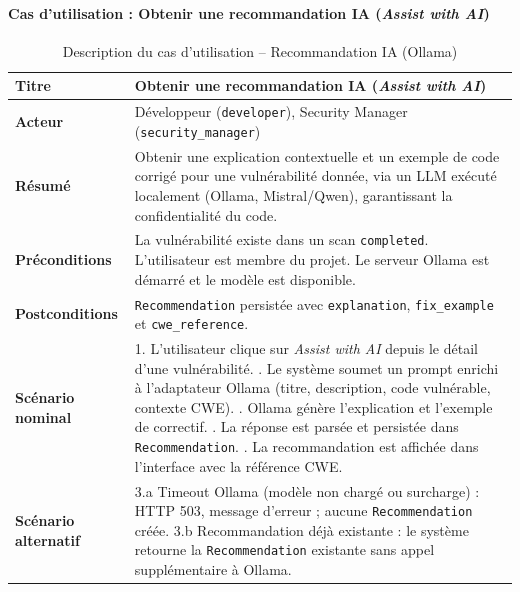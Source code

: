 \paragraph{Cas d'utilisation : Obtenir une recommandation IA (\textit{Assist with AI})}
\begin{table}[H]
\centering
\caption{Description du cas d'utilisation -- Recommandation IA (Ollama)}
\label{tab:uc-llm}
\small
\renewcommand{\arraystretch}{1.3}
\begin{tabularx}{\textwidth}{>{\bfseries}p{3.5cm} X}
\hline
Titre & Obtenir une recommandation IA (\textit{Assist with AI}) \\
\hline
Acteur & Développeur (\texttt{developer}), Security Manager (\texttt{security\_manager}) \\
\hline
Résumé & Obtenir une explication contextuelle et un exemple de code corrigé pour une vulnérabilité donnée, via un LLM exécuté localement (Ollama, Mistral/Qwen), garantissant la confidentialité du code. \\
\hline
Préconditions & La vulnérabilité existe dans un scan \texttt{completed}. L'utilisateur est membre du projet. Le serveur Ollama est démarré et le modèle est disponible. \\
\hline
Postconditions & \texttt{Recommendation} persistée avec \texttt{explanation}, \texttt{fix\_example} et \texttt{cwe\_reference}. \\
\hline
Scénario nominal &
1. L'utilisateur clique sur \textit{Assist with AI} depuis le détail d'une vulnérabilité. \newline
2. Le système soumet un prompt enrichi à l'adaptateur Ollama (titre, description, code vulnérable, contexte CWE). \newline
3. Ollama génère l'explication et l'exemple de correctif. \newline
4. La réponse est parsée et persistée dans \texttt{Recommendation}. \newline
5. La recommandation est affichée dans l'interface avec la référence CWE. \\
\hline
Scénario alternatif &
3.a Timeout Ollama (modèle non chargé ou surcharge) : HTTP 503, message d'erreur ; aucune \texttt{Recommendation} créée. \newline
3.b Recommandation déjà existante : le système retourne la \texttt{Recommendation} existante sans appel supplémentaire à Ollama. \\
\hline
\end{tabularx}
\end{table}

